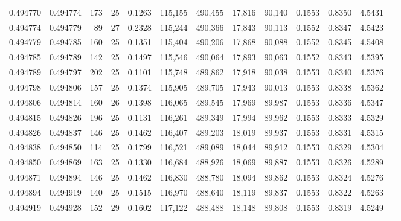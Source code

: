 \begin{tabular}{rrrrrrrrrrrrr}
0.494770 & 0.494774 & 173 &  25 &                                     0.1263 & 115,155 & 490,455 &  17,816 &  90,140 & 0.1553 & 0.8350 & 4.5431 \\
0.494774 & 0.494779 &  89 &  27 &                                     0.2328 & 115,244 & 490,366 &  17,843 &  90,113 & 0.1552 & 0.8347 & 4.5423 \\
0.494779 & 0.494785 & 160 &  25 &                                     0.1351 & 115,404 & 490,206 &  17,868 &  90,088 & 0.1552 & 0.8345 & 4.5408 \\
0.494785 & 0.494789 & 142 &  25 &                                     0.1497 & 115,546 & 490,064 &  17,893 &  90,063 & 0.1552 & 0.8343 & 4.5395 \\
0.494789 & 0.494797 & 202 &  25 &                                     0.1101 & 115,748 & 489,862 &  17,918 &  90,038 & 0.1553 & 0.8340 & 4.5376 \\
0.494798 & 0.494806 & 157 &  25 &                                     0.1374 & 115,905 & 489,705 &  17,943 &  90,013 & 0.1553 & 0.8338 & 4.5362 \\
0.494806 & 0.494814 & 160 &  26 &                                     0.1398 & 116,065 & 489,545 &  17,969 &  89,987 & 0.1553 & 0.8336 & 4.5347 \\
0.494815 & 0.494826 & 196 &  25 &                                     0.1131 & 116,261 & 489,349 &  17,994 &  89,962 & 0.1553 & 0.8333 & 4.5329 \\
0.494826 & 0.494837 & 146 &  25 &                                     0.1462 & 116,407 & 489,203 &  18,019 &  89,937 & 0.1553 & 0.8331 & 4.5315 \\
0.494838 & 0.494850 & 114 &  25 &                                     0.1799 & 116,521 & 489,089 &  18,044 &  89,912 & 0.1553 & 0.8329 & 4.5304 \\
0.494850 & 0.494869 & 163 &  25 &                                     0.1330 & 116,684 & 488,926 &  18,069 &  89,887 & 0.1553 & 0.8326 & 4.5289 \\
0.494871 & 0.494894 & 146 &  25 &                                     0.1462 & 116,830 & 488,780 &  18,094 &  89,862 & 0.1553 & 0.8324 & 4.5276 \\
0.494894 & 0.494919 & 140 &  25 &                                     0.1515 & 116,970 & 488,640 &  18,119 &  89,837 & 0.1553 & 0.8322 & 4.5263 \\
0.494919 & 0.494928 & 152 &  29 &                                     0.1602 & 117,122 & 488,488 &  18,148 &  89,808 & 0.1553 & 0.8319 & 4.5249 \\

\end{tabular}
